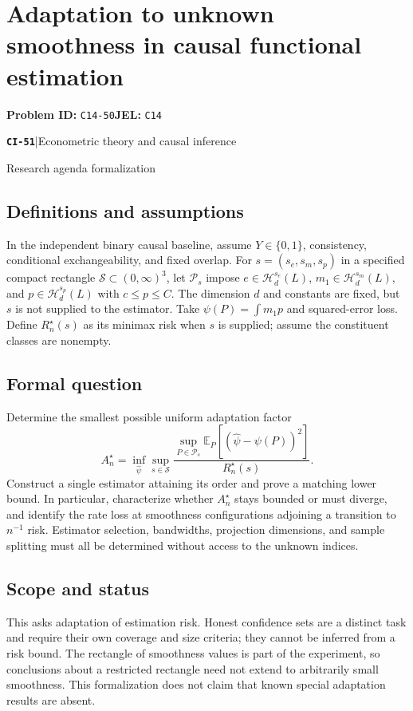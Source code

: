\documentclass[11pt,a4paper]{article}
\newcommand{\E}{\mathbb E}
\newcommand{\entrymeta}[3]{{\sffamily\small\color{muted}\textbf{\texttt{#1}}\quad|\quad #2\par #3\par}}
\begin{document}
\section*{Adaptation to unknown smoothness in causal functional estimation}
\textbf{Problem ID:} \texttt{C14-50}\quad \textbf{JEL:} \texttt{C14}\par
\label{problem:OP-0530}
\label{beyond:CI-51}
\entrymeta{CI-51}{Econometric theory and causal inference}{Research agenda formalization}
\subsection*{Definitions and assumptions}
In the independent binary causal baseline, assume $Y\in\{0,1\}$, consistency, conditional exchangeability, and fixed overlap. For $s=(s_e,s_m,s_p)$ in a specified compact rectangle $\mathcal S\subset(0,\infty)^3$, let $\mathcal P_s$ impose
$e\in\mathcal H_d^{s_e}(L)$, $m_1\in\mathcal H_d^{s_m}(L)$, and $p\in\mathcal H_d^{s_p}(L)$ with $c\leq p\leq C$. The dimension $d$ and constants are fixed, but $s$ is not supplied to the estimator. Take $\psi(P)=\int m_1p$ and squared-error loss. Define $R_n^\star(s)$ as its minimax risk when $s$ is supplied; assume the constituent classes are nonempty.
\subsection*{Formal question}
Determine the smallest possible uniform adaptation factor
\[
 A_n^\star=
 \inf_{\widehat\psi}
 \sup_{s\in\mathcal S}
 \frac{\sup_{P\in\mathcal P_s}
 \E_P[(\widehat\psi-\psi(P))^2]}{R_n^\star(s)}.
\]
Construct a single estimator attaining its order and prove a matching lower bound. In particular, characterize whether $A_n^\star$ stays bounded or must diverge, and identify the rate loss at smoothness configurations adjoining a transition to $n^{-1}$ risk. Estimator selection, bandwidths, projection dimensions, and sample splitting must all be determined without access to the unknown indices.
\subsection*{Scope and status}
This asks adaptation of estimation risk. Honest confidence sets are a distinct task and require their own coverage and size criteria; they cannot be inferred from a risk bound. The rectangle of smoothness values is part of the experiment, so conclusions about a restricted rectangle need not extend to arbitrarily small smoothness. This formalization does not claim that known special adaptation results are absent.
\end{document}
